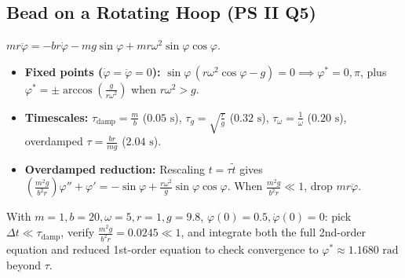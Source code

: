 \documentclass[10pt,a4paper]{article}
\begin{document}
\subsection{Bead on a Rotating Hoop (PS II Q5)}
\begin{theorybox}
$mr\ddot\varphi = -br\dot\varphi - mg\sin\varphi + mr\omega^2\sin\varphi\cos\varphi$.
\begin{itemize}
\item \textbf{Fixed points ($\dot\varphi = \ddot\varphi = 0$):} $\sin\varphi\,(r\omega^2\cos\varphi - g) = 0 \implies \varphi^* = 0, \pi$, plus $\varphi^* = \pm\arccos\left(\frac{g}{r\omega^2}\right)$ when $r\omega^2 > g$.
\item \textbf{Timescales:} $\tau_{\text{damp}} = \frac{m}{b}$ ($0.05\text{ s}$), $\tau_g = \sqrt{\frac{r}{g}}$ ($0.32\text{ s}$), $\tau_\omega = \frac{1}{\omega}$ ($0.20\text{ s}$), overdamped $\tau = \frac{br}{mg}$ ($2.04\text{ s}$).
\item \textbf{Overdamped reduction:} Rescaling $t = \tau\tilde t$ gives $\left(\frac{m^2 g}{b^2 r}\right)\varphi'' + \varphi' = -\sin\varphi + \frac{r\omega^2}{g}\sin\varphi\cos\varphi$. When $\frac{m^2 g}{b^2 r} \ll 1$, drop $mr\ddot\varphi$.
\end{itemize}
\end{theorybox}

\begin{goalbox}
With $m=1, b=20, \omega=5, r=1, g=9.8$, $\varphi(0)=0.5, \dot\varphi(0)=0$: pick $\Delta t \ll \tau_{\text{damp}}$, verify $\frac{m^2 g}{b^2 r} = 0.0245 \ll 1$, and integrate both the full 2nd-order equation and reduced 1st-order equation to check convergence to $\varphi^* \approx 1.1680\text{ rad}$ beyond $\tau$.
\end{goalbox}
\end{document}
